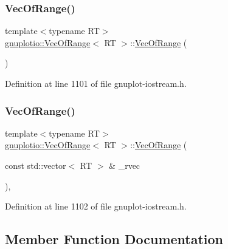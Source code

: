 \subsubsection{\texorpdfstring{Vec\+Of\+Range()}{VecOfRange()}\hspace{0.1cm}{\footnotesize\ttfamily [1/2]}}
{\footnotesize\ttfamily template$<$typename RT$>$ \\
\hyperlink{classgnuplotio_1_1_vec_of_range}{gnuplotio\+::\+Vec\+Of\+Range}$<$ RT $>$\+::\hyperlink{classgnuplotio_1_1_vec_of_range}{Vec\+Of\+Range} (\begin{DoxyParamCaption}{ }\end{DoxyParamCaption})\hspace{0.3cm}{\ttfamily [inline]}}



Definition at line 1101 of file gnuplot-\/iostream.\+h.

\mbox{\label{classgnuplotio_1_1_vec_of_range_a81e04f9ab4b8641d69df61f695e97e34}} 
\subsubsection{\texorpdfstring{Vec\+Of\+Range()}{VecOfRange()}\hspace{0.1cm}{\footnotesize\ttfamily [2/2]}}
{\footnotesize\ttfamily template$<$typename RT$>$ \\
\hyperlink{classgnuplotio_1_1_vec_of_range}{gnuplotio\+::\+Vec\+Of\+Range}$<$ RT $>$\+::\hyperlink{classgnuplotio_1_1_vec_of_range}{Vec\+Of\+Range} (\begin{DoxyParamCaption}\item[{const std\+::vector$<$ RT $>$ \&}]{\+\_\+rvec }\end{DoxyParamCaption})\hspace{0.3cm}{\ttfamily [inline]}, {\ttfamily [explicit]}}



Definition at line 1102 of file gnuplot-\/iostream.\+h.



\subsection{Member Function Documentation}
\mbox{\label{classgnuplotio_1_1_vec_of_range_ab0a35bc07a4f12b18bd1541bc4b771fc}} 

